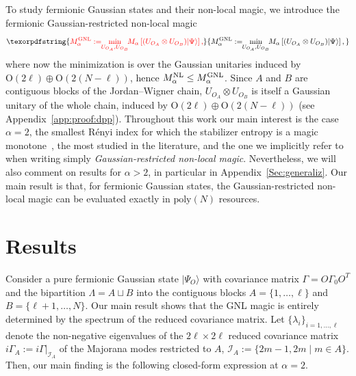 \documentclass[prx,twocolumn,superscriptaddress,aps,10pt, frontmatterverbose, reprint,footinbib,longbibliography=true]{revtex4-2}
\newcommand{\RENYI}{\alpha}
\providecommand{\DIFaddtex}[1]{{\protect\color{red}#1}} %
\providecommand{\DIFaddbegin}{\protect\color{red}} %
\providecommand{\DIFaddend}{\protect\color{black}} %
\providecommand{\DIFaddtex}[1]{\texorpdfstring{\DIFaddtex{#1}}{#1}} %
\providecommand{\DIFadd}[1]{\texorpdfstring{\DIFaddtex{#1}}{#1}} %
\newcommand{\DIFaddincludegraphics}[2][]{{\color{blue}\fbox{\DIFOincludegraphics[#1]{#2}}}} %
\DeclareRobustCommand{\DIFaddbegin}{\DIFOaddbegin \let\includegraphics\DIFaddincludegraphics} %
\DeclareRobustCommand{\DIFaddend}{\DIFOaddend \let\includegraphics\DIFOincludegraphics} %
\begin{document}
To study fermionic Gaussian states and their non-local magic, we introduce the fermionic Gaussian-restricted non-local magic
\DIFaddbegin \begin{equation}
    \DIFadd{M_\RENYI^\textup{GNL}:= \!\!\min_{U_{O_A} , U_{O_B}} \!\!M_\RENYI\left[(U_{O_A}\otimes U_{O_B})|\Psi\rangle\right],\label{eq:defGNLmagic}
}\end{equation}\DIFaddend 
where now the minimization is over the Gaussian unitaries induced by $\mathrm{O}(2\ell)\oplus \mathrm{O}(2(N-\ell))$, hence $ M_\RENYI^\textup{NL} \leq  M_\RENYI^\textup{GNL}$. \DIFaddbegin \DIFadd{Since $A$ and $B$ are contiguous blocks of the Jordan--Wigner chain, $U_{O_A}\otimes U_{O_B}$ is itself a Gaussian unitary of the whole chain, induced by $\mathrm{O}(2\ell)\oplus\mathrm{O}(2(N-\ell))$ (see Appendix~\ref{app:proof:dpp})}\DIFaddend .
Throughout this work our main interest is the case $\RENYI=2$, the smallest R\'enyi index for which the stabilizer entropy is a magic monotone~\cite{piro,leone2024stabilizer}, the most studied in the literature, and the one we implicitly refer to when writing simply \emph{Gaussian-restricted non-local magic}. Nevertheless, we will also comment on results for $\RENYI>2$, in particular in Appendix~\ref{Sec:generaliz}.
Our main result is that, for fermionic Gaussian states, the Gaussian-restricted non-local magic can be evaluated exactly in $\mathrm{poly}(N)$ resources.

\section{Results}
Consider a pure fermionic Gaussian state $|\Psi_O\rangle$ with covariance matrix $\Gamma=O \Gamma_0 O^T$ and the bipartition $\Lambda = A\sqcup B$ \DIFaddbegin \DIFadd{into the contiguous blocks $A=\{1,\dots,\ell\}$ and $B=\{\ell+1,\dots,N\}$}\DIFaddend . 
Our main result shows that the GNL magic is entirely determined by the spectrum of the reduced covariance matrix. Let $\{\lambda_i\}_{i=1,\dots,\ell}$ denote the non-negative eigenvalues of the $2\ell\times 2\ell$ reduced covariance matrix $i\Gamma_A := i\Gamma|_{\mathcal{I}_A}$ of the Majorana modes restricted to $A$, $\mathcal{I}_A:=\{2m-1,2m\;|\; m\in A\}$. Then, our main finding is the following closed-form expression at $\RENYI=2$.
\end{document}

